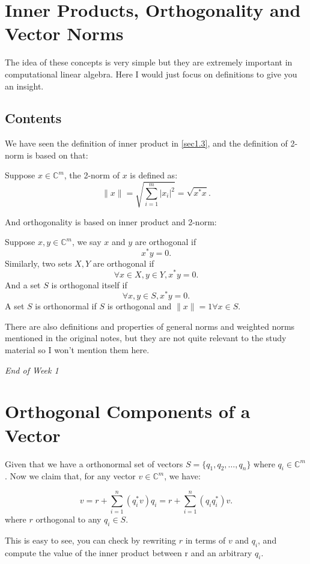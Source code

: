 \section{Inner Products, Orthogonality and Vector Norms}%
\label{sec1.8}
The idea of these concepts is very simple but they are extremely important in computational linear algebra. Here I would just focus on definitions to give you an insight.
\subsection*{Contents}
We have seen the definition of inner product in \autoref{sec1.3}, and the definition of 2-norm is based on that:
\begin{definition}[2-norm]
  Suppose \(x \in \mathbb{C}^{m}\), the 2-norm of \(x\) is defined as:
  \[
    \|x\| = \sqrt{\sum_{i=1}^{m} |x_i|^2} = \sqrt{x^{*}x}
  .\]
\end{definition}
And orthogonality is based on inner product and 2-norm:
\begin{definition}[Orthogonality]
  Suppose \(x, y \in \mathbb{C}^{m}\), we say \(x\) and \(y\) are orthogonal if
  \[
    x^{*}y = 0
  .\]
  Similarly, two sets \(X, Y\) are orthogonal if
  \[
    \forall x \in X, y \in Y, x^{*}y = 0
  .\]
  And a set \(S\) is orthogonal itself if
  \[
    \forall x, y \in S,  x^{*}y = 0
  .\]
  A set \(S\) is orthonormal if \(S\) is orthogonal and \(\|x\| = 1 \forall x \in S\).   
\end{definition}
There are also definitions and properties of general norms and weighted norms mentioned in the original notes, but they are not quite relevant to the study material so I won't mention them here. \checked
\bigskip

\begin{center}
  \textit{\large End of Week 1}
\end{center}
\newpage
\section{Orthogonal Components of a Vector}%
Given that we have a orthonormal set of vectors $S = \{q_1, q_2, \ldots, q_n\} $ where $q_i \in \mathbb{C}^{m}$. Now we claim that, for any vector $v \in \mathbb{C}^{m}$, we have:
\begin{prop}
  \[
  v = r + \sum_{i=1}^{n} (q_i^{*}v)q_i = r + \sum_{i=1}^{n} (q_iq_i^{*})v
.\]
where \(r\) orthogonal to any \(q_i \in S\).
\end{prop}
This is easy to see, you can check by rewriting \(r\)  in terms of \(v\)  and \(q_i\), and compute the value of the inner product between r and an arbitrary \(q_i\). \smallskip

